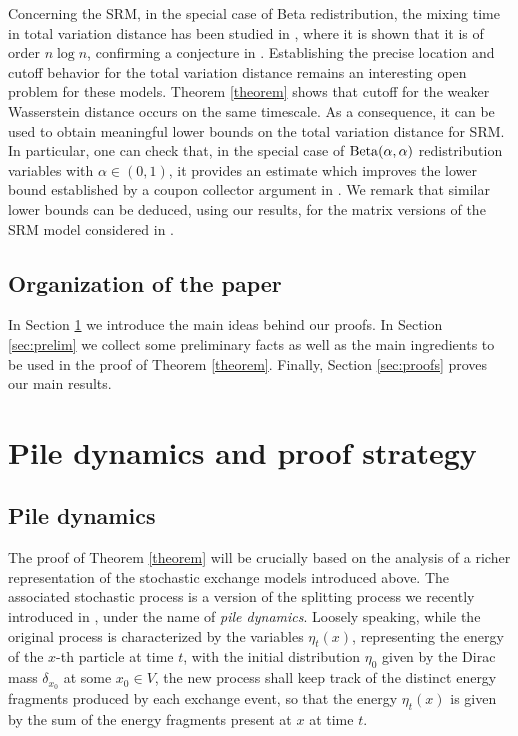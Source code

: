 \documentclass[11pt,reqno]{amsart}
\theoremstyle{remark}
\theoremstyle{definition}
\numberwithin{equation}{section}
\numberwithin{figure}{section}
\let\a=\alpha \let\b=\beta  \let\c=\chi \let\d=\delta  \let\e=\varepsilon
\begin{document}
Concerning the SRM, in the special case of Beta redistribution, the mixing time in total variation distance has been studied in  \cite{smith_gibbs_2014}, where it is shown that it is of order $n\log n$, confirming a conjecture in \cite[Section 13.1.4]{aldous-fill-2014}. Establishing the precise location and cutoff  behavior for the total variation distance remains an interesting open problem for these models.  Theorem \ref{theorem} shows that cutoff for the weaker Wasserstein distance occurs on the same timescale. As a consequence, it can be used to obtain meaningful lower bounds on the total variation distance for SRM. In particular, one can check that, in the special case of ${\rm Beta}(\a,\a)$ redistribution variables 	with $\a\in(0,1)$, it provides an estimate which improves the lower bound established 
by a coupon collector argument  in  \cite{smith_gibbs_2014}. 
We remark that similar lower bounds can be deduced, using our results, for the matrix versions of the SRM model considered in  \cite{diaconis_saloff-coste_bounds_2000,oliveira_convergence_2009,jiang_kac_2017}.

\subsection{Organization of the paper}
In Section \ref{sec:piledyn} we introduce the main ideas behind our proofs. In Section \ref{sec:prelim} we collect some preliminary facts as well as the main ingredients to be used in the proof of Theorem \ref{theorem}. Finally, Section \ref{sec:proofs} proves our main results. 



	\section{Pile dynamics and proof strategy}
	\label{sec:piledyn}
	\subsection{Pile dynamics}
The proof of Theorem \ref{theorem} will be crucially based on the analysis of a richer representation of the stochastic exchange models introduced above. The associated stochastic process is a version of the splitting process we recently introduced  
 in  \cite{caputo2024repeated}, under the name of \emph{pile dynamics}. Loosely speaking, while the original process is characterized by the variables $\eta_t(x)$, representing  the energy of the $x$-th particle at time $t$, with the initial distribution $\eta_0$ given by the Dirac mass $\d_{x_0}$ at some  $x_0\in V$, the new process shall keep track of the distinct energy fragments produced by each exchange event, so that the energy $\eta_t(x)$ is given by the sum of the energy fragments present at $x$ at time $t$. 
 
\end{document}
